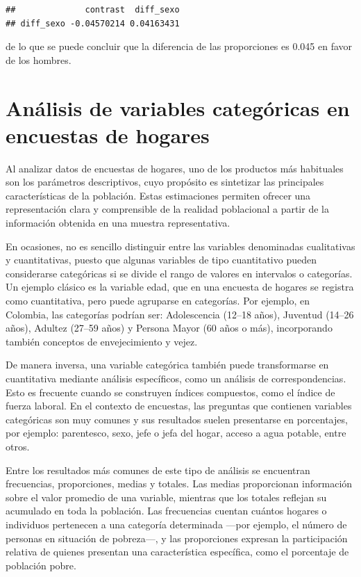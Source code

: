 \documentclass[
  spanish,
  12pt,
]{book}
\begin{document}
\begin{verbatim}
##              contrast  diff_sexo
## diff_sexo -0.04570214 0.04163431
\end{verbatim}

de lo que se puede concluir que la diferencia de las proporciones es 0.045 en favor de los hombres.

\chapter{Análisis de variables categóricas en encuestas de hogares}\label{anuxe1lisis-de-variables-categuxf3ricas-en-encuestas-de-hogares}

Al analizar datos de encuestas de hogares, uno de los productos más habituales son los parámetros descriptivos, cuyo propósito es sintetizar las principales características de la población. Estas estimaciones permiten ofrecer una representación clara y comprensible de la realidad poblacional a partir de la información obtenida en una muestra representativa.

En ocasiones, no es sencillo distinguir entre las variables denominadas cualitativas y cuantitativas, puesto que algunas variables de tipo cuantitativo pueden considerarse categóricas si se divide el rango de valores en intervalos o categorías. Un ejemplo clásico es la variable edad, que en una encuesta de hogares se registra como cuantitativa, pero puede agruparse en categorías. Por ejemplo, en Colombia, las categorías podrían ser: Adolescencia (12--18 años), Juventud (14--26 años), Adultez (27--59 años) y Persona Mayor (60 años o más), incorporando también conceptos de envejecimiento y vejez.

De manera inversa, una variable categórica también puede transformarse en cuantitativa mediante análisis específicos, como un análisis de correspondencias. Esto es frecuente cuando se construyen índices compuestos, como el índice de fuerza laboral. En el contexto de encuestas, las preguntas que contienen variables categóricas son muy comunes y sus resultados suelen presentarse en porcentajes, por ejemplo: parentesco, sexo, jefe o jefa del hogar, acceso a agua potable, entre otros.

Entre los resultados más comunes de este tipo de análisis se encuentran frecuencias, proporciones, medias y totales. Las medias proporcionan información sobre el valor promedio de una variable, mientras que los totales reflejan su acumulado en toda la población. Las frecuencias cuentan cuántos hogares o individuos pertenecen a una categoría determinada ---por ejemplo, el número de personas en situación de pobreza---, y las proporciones expresan la participación relativa de quienes presentan una característica específica, como el porcentaje de población pobre.
\end{document}
